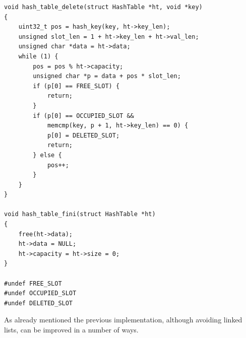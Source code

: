 \documentclass[12pt]{article}
\theoremstyle{plain}
\theoremstyle{remark}
\begin{document}
\begin{lstlisting}[style=C]
void hash_table_delete(struct HashTable *ht, void *key)
{
	uint32_t pos = hash_key(key, ht->key_len);
	unsigned slot_len = 1 + ht->key_len + ht->val_len;
	unsigned char *data = ht->data;
	while (1) {
		pos = pos % ht->capacity;
		unsigned char *p = data + pos * slot_len;
		if (p[0] == FREE_SLOT) {
			return;
		}
		if (p[0] == OCCUPIED_SLOT &&
		    memcmp(key, p + 1, ht->key_len) == 0) {
			p[0] = DELETED_SLOT;
			return;
		} else {
			pos++;
		}
	}
}

void hash_table_fini(struct HashTable *ht)
{
	free(ht->data);
	ht->data = NULL;
	ht->capacity = ht->size = 0;
}

#undef FREE_SLOT
#undef OCCUPIED_SLOT
#undef DELETED_SLOT
\end{lstlisting}

As already mentioned  the previous implementation, although avoiding linked
lists, can be improved in a number of ways. 
\end{document}
